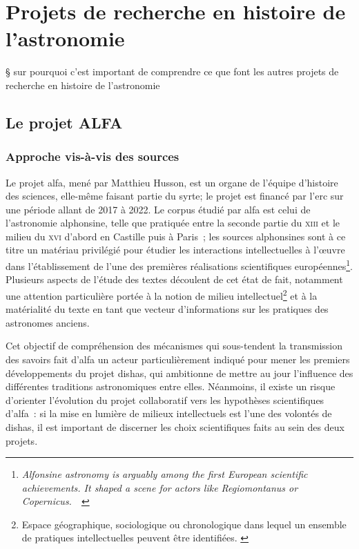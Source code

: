 \documentclass[a4paper,12pt,twoside]{book}
\newcommand{\eng}{\emph}
\newcommand{\XIII}{\textsc{xiii}\ieme{}\xspace}
\newcommand{\XVI}{\textsc{xvi}\ieme{}\xspace}
\newcommand{\g}[1]{\og#1~\fg}
\newcommand{\dishas}{\gls{dishas}\xspace}
\newcommand{\alfa}{\gls{alfa}\xspace}
\newcommand{\syrte}{\gls{syrte}\xspace}
\newcommand{\erc}{\gls{erc}\xspace}
\begin{document}
	\section{Projets de recherche en histoire de l'astronomie}

§ sur pourquoi c'est important de comprendre ce que font les autres projets de recherche en histoire de l'astronomie

		\subsection{Le projet ALFA}
			\subsubsection{Approche vis-à-vis des sources}
Le projet \alfa, mené par Matthieu Husson, est un organe de l'équipe d'histoire des sciences, elle-même faisant partie du \syrte; le projet est financé par l'\erc sur une période allant de 2017 à 2022. Le corpus étudié par \alfa est celui de l'astronomie alphonsine, telle que pratiquée entre la seconde partie du \XIII et le milieu du \XVI d'abord en Castille puis à Paris~; les sources alphonsines sont à ce titre un matériau privilégié pour étudier les interactions intellectuelles à l'œuvre dans l'établissement de l'une des premières réalisations scientifiques européennes\footnote{\g{\eng{Alfonsine astronomy is arguably among the first European scientific achievements. It shaped a scene for actors like Regiomontanus or Copernicus.}}~\cite{ShapingEuropeanScientific}}. Plusieurs aspects de l'étude des textes découlent de cet état de fait, notamment une attention particulière portée à la notion de milieu intellectuel\footnote{Espace géographique, sociologique ou chronologique dans lequel un ensemble de pratiques intellectuelles peuvent être identifiées. \cite{ShapingEuropeanScientific}} et à la matérialité du texte en tant que vecteur d'informations sur les pratiques des astronomes anciens.


Cet objectif de compréhension des mécanismes qui sous-tendent la transmission des savoirs fait d'\alfa un acteur particulièrement indiqué pour mener les premiers développements du projet \dishas, qui ambitionne de mettre au jour l'influence des différentes traditions astronomiques entre elles. Néanmoins, il existe un risque d'orienter l'évolution du projet collaboratif vers les hypothèses scientifiques d'\alfa~: si la mise en lumière de milieux intellectuels est l'une des volontés de \dishas, il est important de discerner les choix scientifiques faits au sein des deux projets.
\end{document}
